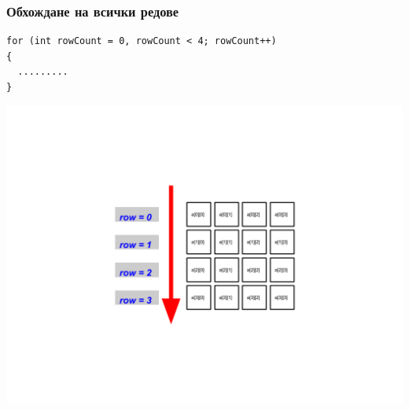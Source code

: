\documentclass{beamer}
\begin{document}
\begin{frame}[fragile]
\frametitle{Обхождане на всички редове}

\begin{flushleft}

\begin{lstlisting}
for (int rowCount = 0, rowCount < 4; rowCount++)
{
  .........
}
\end{lstlisting}
\end{flushleft}

\vspace*{-100pt}
\includegraphics[width=14cm]{images/matr_iter_rows} 

\end{frame}
\end{document}
